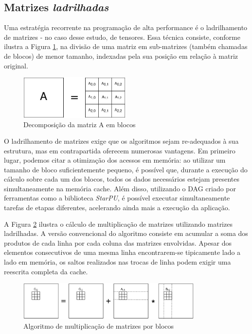 \documentclass[cic,tc]{iiufrgs}
\begin{document}
\subsection{Matrizes \textit{ladrilhadas}}

Uma estratégia recorrente na programação de alta performance é o ladrilhamento de matrizes - no caso desse estudo, de tensores. Essa técnica consiste, conforme ilustra a Figura \ref{fig:tiled_matrix},
na divisão de uma matriz em sub-matrizes (também chamadas de blocos) de menor tamanho, indexadas pela sua posição em relação à matriz original.

\begin{figure}[!htb]
    \caption{Decomposição da matriz A em blocos}
    \begin{center}
      \includegraphics[width=15em]{tiled_matrix}
    \end{center}
    \label{fig:tiled_matrix}
\end{figure}

O ladrilhamento de matrizes exige que os algoritmos sejam re-adequados à sua estrutura, mas em contrapartida oferecem numerosas vantagens. Em primeiro lugar, podemos citar a
otimização dos acessos em memória: ao utilizar um tamanho de bloco suficientemente pequeno, é possível que, durante a execução do cálculo sobre cada um dos blocos, todos os dados
necessários estejam presentes simultaneamente na memória cache. Além disso, utilizando o DAG criado por ferramentas como a biblioteca \textit{StarPU}, é possível executar
simultaneamente tarefas de etapas diferentes, acelerando ainda mais a execução da aplicação.

A Figura \ref{fig:gemm} ilustra o cálculo de multiplicação de matrizes utilizando matrizes ladrilhadas. A versão convencional do algoritmo consiste em acumular a soma dos produtos de
cada linha por cada coluna das matrizes envolvidas. Apesar dos elementos consecutivos de uma mesma linha encontrarem-se tipicamente lado a lado em memória, os saltos realizados nas trocas
de linha podem exigir uma reescrita completa da cache.

\begin{figure}[!htb]
    \caption{Algoritmo de multiplicação de matrizes por blocos}
    \begin{center}
      \includegraphics[width=25em]{gemm}
    \end{center}
    \label{fig:gemm}
\end{figure}
\end{document}
